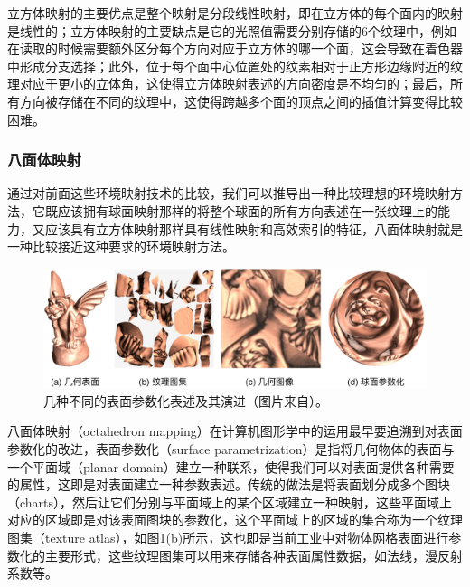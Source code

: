 立方体映射的主要优点是整个映射是分段线性映射，即在立方体的每个面内的映射是线性的；立方体映射的主要缺点是它的光照值需要分别存储的6个纹理中，例如在读取的时候需要额外区分每个方向对应于立方体的哪一个面，这会导致在着色器中形成分支选择；此外，位于每个面中心位置处的纹素相对于正方形边缘附近的纹理对应于更小的立体角，这使得立方体映射表述的方向密度是不均匀的；最后，所有方向被存储在不同的纹理中，这使得跨越多个面的顶点之间的插值计算变得比较困难。



\subsubsection{八面体映射}
通过对前面这些环境映射技术的比较，我们可以推导出一种比较理想的环境映射方法，它既应该拥有球面映射那样的将整个球面的所有方向表述在一张纹理上的能力，又应该具有立方体映射那样具有线性映射和高效索引的特征，八面体映射就是一种比较接近这种要求的环境映射方法。

\begin{figure}
	\includegraphics[width=\textwidth]{figures/pl/surface-parametrization}
	\caption{几种不同的表面参数化表述及其演进（图片来自\cite{a:SphericalParametrizationandRemeshing}）。}
	\label{f:pl-surface-parametrization}
\end{figure}

八面体映射（octahedron mapping）在计算机图形学中的运用最早要追溯到对表面参数化的改进，表面参数化（surface parametrization）是指将几何物体的表面与一个平面域（planar domain）建立一种联系，使得我们可以对表面提供各种需要的属性，这即是对表面建立一种参数表述。传统的做法是将表面划分成多个图块（charts），然后让它们分别与平面域上的某个区域建立一种映射，这些平面域上对应的区域即是对该表面图块的参数化，这个平面域上的区域的集合称为一个纹理图集（texture atlas）\cite{a:Texturemappingprogressivemeshes,a:Interactivetexturemapping,a:Ageneralmethodforpreservingattributevaluesonsimplifiedmeshes,a:Leastsquaresconformalmapsforautomatictextureatlasgeneration}，如图\ref{f:pl-surface-parametrization}(b)所示，这也即是当前工业中对物体网格表面进行参数化的主要形式，这些纹理图集可以用来存储各种表面属性数据，如法线，漫反射系数等。

